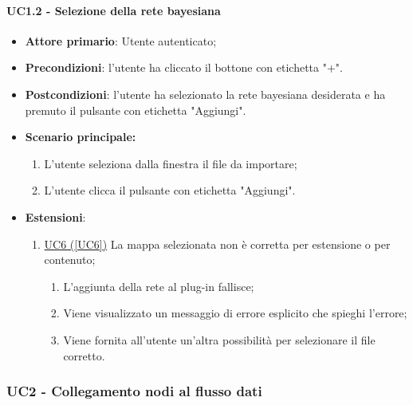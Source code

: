 \paragraph{UC1.2 - Selezione della rete bayesiana}\label{UC1.2}
\begin{itemize}
	\item \textbf{Attore primario}: Utente autenticato;
	\item \textbf{Precondizioni}: l'utente ha cliccato il bottone con etichetta "+".
	\item \textbf{Postcondizioni}: l'utente ha selezionato la rete bayesiana desiderata e ha premuto il pulsante con etichetta "Aggiungi".
	\item \textbf{Scenario principale:}
	\begin{enumerate}
		\item L'utente seleziona dalla finestra il file da importare;
		\item L'utente clicca il pulsante con etichetta "Aggiungi".
	\end{enumerate}
	\item \textbf{Estensioni}:
	\begin{enumerate}
		\item \hyperref[UC6]{UC6 (\ref*{UC6})} La mappa selezionata non è corretta per estensione o per contenuto;
		\begin{enumerate}
			\item L'aggiunta della rete al plug-in fallisce;
			\item Viene visualizzato un messaggio di errore esplicito che spieghi l'errore;
			\item Viene fornita all'utente un'altra possibilità per selezionare il file corretto.
		\end{enumerate}
	\end{enumerate}
\end{itemize}

\pagebreak

\subsubsection{UC2 - Collegamento nodi al flusso dati}\label{UC2}

